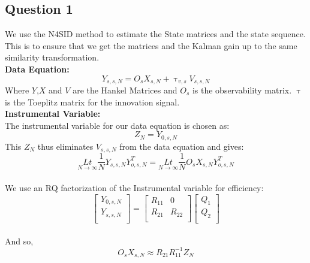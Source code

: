\documentclass[12pt]{report}
\begin{document}
\subsection*{Question 1}
We use the N4SID method to estimate the State matrices and the state sequence. This is to ensure that we get the matrices and the Kalman gain up to the same similarity transformation.
\\
\textbf{Data Equation:}\\
\begin{equation}
Y_{s,s,N} = O_s X_{s,N} + \uptau_{v,s} V_{s,s,N}
\end{equation}
Where $Y$,$X$ and $V$ are the Hankel Matrices and $O_s$ is the observability matrix. $\uptau$ is the Toeplitz matrix for the innovation signal.\\
\textbf{Instrumental Variable:}\\
The instrumental variable for our data equation is chosen as:\\
\begin{equation*}
Z_N = Y_{0,s,N}
\end{equation*}
This $Z_N$ thus eliminates $V_{s,s,N}$ from the data equation and gives:
\begin{equation*}
\underset{N\rightarrow \infty}{Lt} \frac{1}{N} Y_{s,s,N} Y_{o,s,N}^{T} = \underset{N\rightarrow \infty}{Lt} \frac{1}{N} O_{s} X_{s,N} Y_{o,s,N}^{T}
\end{equation*}
\\
We use an RQ factorization of the Instrumental variable for efficiency:\\
\begin{equation*}
\begin{bmatrix}
Y_{0,s,N}\\
Y_{s,s,N}\\
\end{bmatrix}
 = \begin{bmatrix}
 R_{11} & 0\\
 R_{21} & R_{22}\\
 \end{bmatrix}
 \begin{bmatrix}
 Q_1\\
 Q_2\\
 \end{bmatrix}
\end{equation*}
\\
And so,
\begin{equation}
O_s X_{s,N} \approx R_{21} R_{11}^{-1} Z_N
\end{equation}
\\
\end{document}
